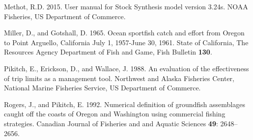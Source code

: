 \documentclass[12pt,]{article}
\begin{document}
\hypertarget{ref-Methot2015}{}
Methot, R.D. 2015. User manual for Stock Synthesis model version 3.24s.
NOAA Fisheries, US Department of Commerce.

\hypertarget{ref-Miller1965}{}
Miller, D., and Gotshall, D. 1965. Ocean sportfish catch and effort from
Oregon to Point Arguello, California July 1, 1957-June 30, 1961. State
of California, The Resources Agency Department of Fish and Game, Fish
Bulletin \textbf{130}.

\hypertarget{ref-Pikitch1988}{}
Pikitch, E., Erickson, D., and Wallace, J. 1988. An evaluation of the
effectiveness of trip limits as a management tool. Northwest and Alaska
Fisheries Center, National Marine Fisheries Service, US Department of
Commerce.

\hypertarget{ref-Rogers1992}{}
Rogers, J., and Pikitch, E. 1992. Numerical definition of groundfish
assemblages caught off the coasts of Oregon and Washington using
commercial fishing strategies. Canadian Journal of Fisheries and and
Aquatic Sciences \textbf{49}: 2648--2656.
\end{document}
